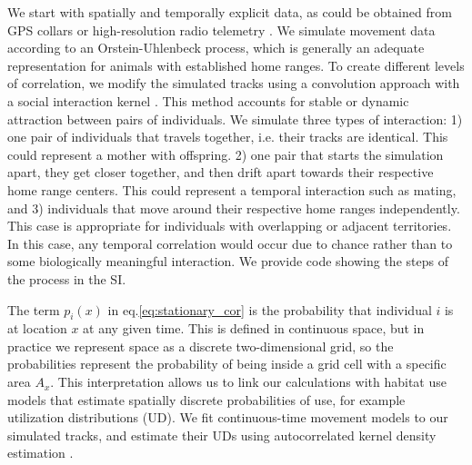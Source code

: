\documentclass[letterpaper]{article}
\begin{document}
We start with spatially and temporally explicit data, as could be obtained from GPS collars or high-resolution radio telemetry \citep{Aspillaga2021}. We simulate movement data according to an Orstein-Uhlenbeck process, which is generally an adequate representation for animals with established home ranges. To create different levels of correlation, we modify the simulated tracks using a  convolution approach with a social interaction kernel \citep{Scharf2018}. This method accounts for stable or dynamic attraction between pairs of individuals. We simulate three types of interaction: 1) one pair of individuals that travels together, i.e. their tracks are identical. This could represent a mother with offspring. 2) one pair that starts the simulation apart, they get closer together, and then drift apart towards their respective home range centers. This could represent a temporal interaction such as mating, and 3) individuals that move around their respective home ranges independently. This case is appropriate for individuals with overlapping or adjacent territories. In this case, any temporal correlation would occur due to chance rather than to some biologically meaningful interaction. We provide code showing the steps of the process in the SI. %

The term $p_i(x)$ in eq.\ref{eq:stationary_cor} is the probability that individual $i$ is at location $x$ at any given time. This is defined in continuous space, but in practice we represent space as a discrete two-dimensional grid, so the probabilities represent the probability of being inside a grid cell with a specific area $A_x$. This interpretation allows us to link our calculations with habitat use models that estimate spatially discrete probabilities of use, for example utilization distributions (UD). We fit continuous-time movement models to our simulated tracks, and estimate their UDs using autocorrelated kernel density estimation \citep{Calabrese2016}.
\end{document}
